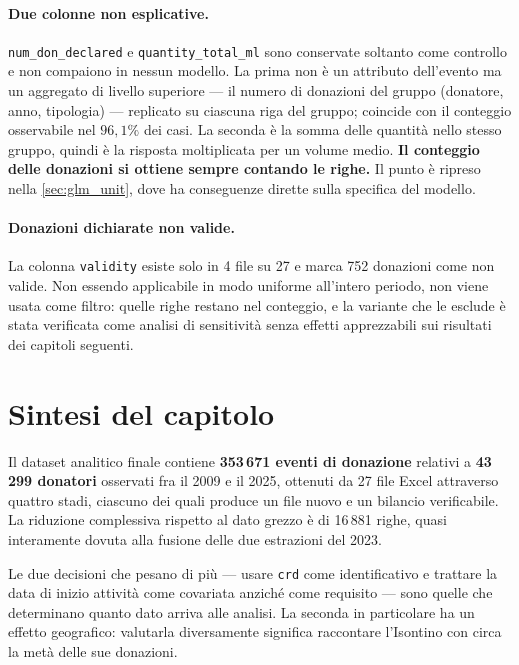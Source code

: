 \paragraph{Due colonne non esplicative.}
\texttt{num\_don\_declared} e \texttt{quantity\_total\_ml} sono conservate
soltanto come controllo e non compaiono in nessun modello. La prima non è un
attributo dell'evento ma un aggregato di livello superiore --- il numero di
donazioni del gruppo (donatore, anno, tipologia) --- replicato su ciascuna riga
del gruppo; coincide con il conteggio osservabile nel $96{,}1\%$ dei casi. La
seconda è la somma delle quantità nello stesso gruppo, quindi è la risposta
moltiplicata per un volume medio. \textbf{Il conteggio delle donazioni si
ottiene sempre contando le righe.} Il punto è ripreso nella
\cref{sec:glm_unit}, dove ha conseguenze dirette sulla specifica del modello.

\paragraph{Donazioni dichiarate non valide.}
La colonna \texttt{validity} esiste solo in 4 file su 27 e marca 752 donazioni
come non valide. Non essendo applicabile in modo uniforme all'intero periodo,
non viene usata come filtro: quelle righe restano nel conteggio, e la variante
che le esclude è stata verificata come analisi di sensitività senza effetti
apprezzabili sui risultati dei capitoli seguenti.

\section{Sintesi del capitolo}
\label{sec:datasummary}

Il dataset analitico finale contiene \textbf{353\,671 eventi di donazione}
relativi a \textbf{43\,299 donatori} osservati fra il 2009 e il 2025, ottenuti
da 27 file Excel attraverso quattro stadi, ciascuno dei quali produce un file
nuovo e un bilancio verificabile. La riduzione complessiva rispetto al dato
grezzo è di 16\,881 righe, quasi interamente dovuta alla fusione delle due
estrazioni del 2023.

Le due decisioni che pesano di più --- usare \texttt{crd} come identificativo e
trattare la data di inizio attività come covariata anziché come requisito ---
sono quelle che determinano quanto dato arriva alle analisi. La seconda in
particolare ha un effetto geografico: valutarla diversamente significa
raccontare l'Isontino con circa la metà delle sue donazioni.

